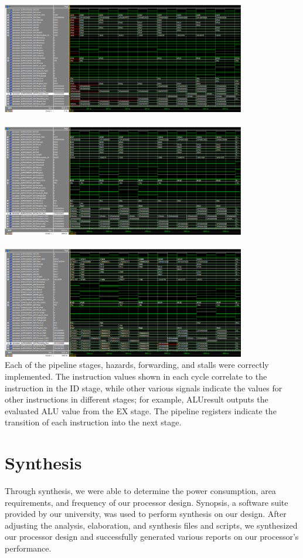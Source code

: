 \documentclass{article}
\begin{document}
\includegraphics[width=0.8\textwidth]{Waveform1.png} \\ \\
\includegraphics[width=0.8\textwidth]{Waveform2.png} \\ \\
\includegraphics[width=0.8\textwidth]{Waveform3.png} \\

Each of the pipeline stages, hazards, forwarding, and stalls were correctly implemented. The instruction values shown in each cycle correlate to the instruction in the ID stage, while other various signals indicate the values for other instructions in different stages; for example, ALUresult outputs the evaluated ALU value from the EX stage. The pipeline registers indicate the transition of each instruction into the next stage.

\section{Synthesis}
Through synthesis, we were able to determine the power consumption, area requirements, and frequency of our processor design. Synopsis, a software suite provided by our university, was used to perform synthesis on our design. After adjusting the analysis, elaboration, and synthesis files and scripts, we synthesized our processor design and successfully generated various reports on our processor's performance.
\end{document}
